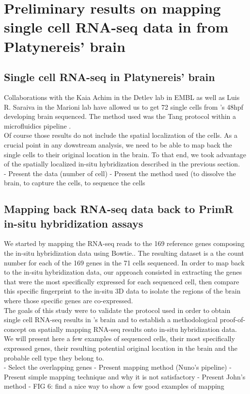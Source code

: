 \section{Preliminary results on mapping single cell RNA-seq data in from Platynereis' brain}\label{sec:back_mapping_platy}
  \subsection*{Single cell RNA-seq in Platynereis' brain}
  
    	Collaborations with the Kaia Achim in the Detlev lab in EMBL as well as Luis R. Saraiva in the Marioni lab have allowed us to get 72 single cells from \platy{}'s 48hpf developing brain sequenced. The method used was the Tang protocol \cite{tang09} within a microfluidics pipeline .\\
  	
	Of course those results do not include the spatial localization of the cells. As a crucial point in any dowstream analysis, we need to be able to map back the single cells to their original location in the brain. To that end, we took advantage of the spatially localized in-situ hybridization described in the previous section.\\
	
    - Present the data (number of cell)
    - Present the method used (to dissolve the brain, to capture the cells, to sequence the cells
  \subsection*{Mapping back RNA-seq data back to PrimR in-situ hybridization assays}
  	We started by mapping the RNA-seq reads to the 169 reference genes composing the in-situ hybridization data using Bowtie.. The resulting dataset is a the count number for each of the 169 genes in the 71 cells sequenced. In order to map back to the in-situ hybridization data, our approach consisted in extracting the genes that were the most specifically expressed for each sequenced cell, then compare this specific fingerprint to the in-situ 3D data to isolate the regions of the brain where those specific genes are co-expressed.\\
	
	The goals of this study were to validate the protocol used in order to obtain single cell RNA-seq results in \platy{}'s brain and to establish a methodological proof-of-concept on spatially mapping RNA-seq results onto in-situ hybridization data. We will present here a few examples of sequenced cells, their most specifically expressed genes, their resulting potential original location in the brain and the probable cell type they belong to.\\
    - Select the overlapping genes
    - Present mapping method (Nuno's pipeline)
    - Present simple mapping technique and why it is not satisfactory
    - Present John's method  
    - FIG 6: find a nice way to show a few good examples of mapping

